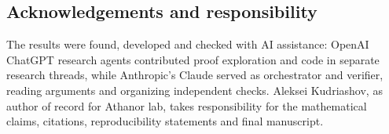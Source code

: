 \documentclass[11pt]{amsart}
\theoremstyle{remark}
\begin{document}
\subsection*{Acknowledgements and responsibility}
The results were found, developed and checked with AI assistance:
OpenAI ChatGPT research agents contributed proof exploration and code
in separate research threads, while Anthropic's Claude served as
orchestrator and verifier, reading arguments and organizing independent
checks. Aleksei Kudriashov, as author of record for Athanor lab,
takes responsibility for the mathematical claims, citations,
reproducibility statements and final manuscript.



\end{document}
